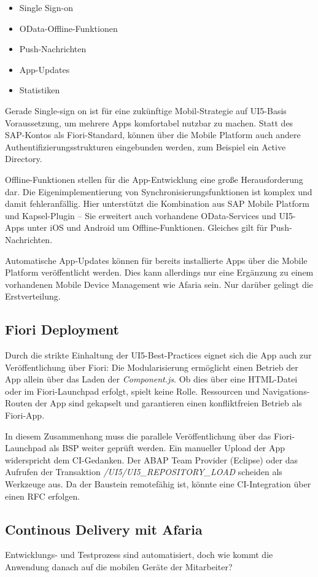 \begin{itemize}
	\item Single Sign-on
	\item OData-Offline-Funktionen
	\item Push-Nachrichten
	\item App-Updates
	\item Statistiken
\end{itemize}
Gerade Single-sign on ist für eine zukünftige Mobil-Strategie auf UI5-Basis Voraussetzung, um mehrere Apps komfortabel nutzbar zu machen. Statt des SAP-Kontos als Fiori-Standard, können über die Mobile Platform auch andere Authentifizierungsstrukturen eingebunden werden, zum Beispiel ein Active Directory.

Offline-Funktionen stellen für die App-Entwicklung eine große Herausforderung dar. Die Eigenimplementierung von Synchronisierungsfunktionen ist komplex und damit fehleranfällig. Hier unterstützt die Kombination aus SAP Mobile Platform und Kapsel-Plugin -- Sie erweitert auch vorhandene OData-Services und UI5-Apps unter iOS und Android um Offline-Funktionen. Gleiches gilt für Push-Nachrichten.

Automatische App-Updates können für bereits installierte Apps über die Mobile Platform veröffentlicht werden. Dies kann allerdings nur eine Ergänzung zu einem vorhandenen Mobile Device Management wie Afaria sein. Nur darüber gelingt die Erstverteilung.

\subsection{Fiori Deployment}
Durch die strikte Einhaltung der UI5-Best-Practices eignet sich die App auch zur Veröffentlichung über Fiori: Die Modularisierung ermöglicht einen Betrieb der App allein über das Laden der \textit{Component.js}. Ob dies über eine HTML-Datei oder im Fiori-Launchpad erfolgt, spielt keine Rolle. Ressourcen und Navigations-Routen der App sind gekapselt und garantieren einen konfliktfreien Betrieb als Fiori-App.

In diesem Zusammenhang muss die parallele Veröffentlichung über das Fiori-Launchpad als BSP weiter geprüft werden. Ein manueller Upload der App widerspricht dem CI-Gedanken. Der ABAP Team Provider (Eclipse) oder das Aufrufen der Transaktion \textit{/UI5/UI5\_REPOSITORY\_LOAD} scheiden als Werkzeuge aus. Da der Baustein remotefähig ist, könnte eine CI-Integration über einen RFC erfolgen.

\subsection{Continous Delivery mit Afaria}
Entwicklungs- und Testprozess sind automatisiert, doch wie kommt die Anwendung danach auf die mobilen Geräte der Mitarbeiter?

